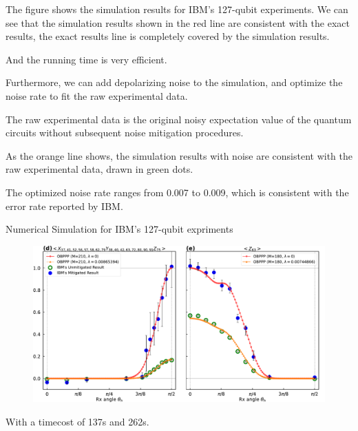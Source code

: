 \documentclass[10pt]{beamer}
\begin{document}
\begin{CJK}{UTF8}{gbsn}
{ The figure shows the simulation results for IBM's 127-qubit experiments.
 We can see that the simulation results shown in the red line are consistent with the exact results, the exact results line is completely covered by the simulation results.

 And the running time is very efficient.

 Furthermore, we can add depolarizing noise to the simulation, and optimize the noise rate to fit the raw experimental data.

 The raw experimental data is the original noisy expectation value of the quantum circuits without subsequent noise mitigation procedures.

 As the orange line shows, the simulation results with noise are consistent with the raw experimental data, drawn in green dots.

 The optimized noise rate ranges from 0.007 to 0.009, which is consistent with the error rate reported by IBM.
}

\begin{frame}[fragile]{Numerical Simulation for IBM's 127-qubit expriments}
  \begin{figure}
    \centering
    \includegraphics[width=\textwidth]{fig/simibm2.pdf}
  \end{figure}
With a timecost of 137s and 262s.
\end{frame}


\end{CJK}
\end{document}
